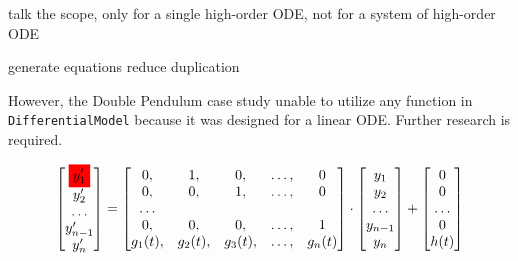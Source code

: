 talk the scope, only for a single high-order ODE, not for a system of high-order ODE

generate equations
reduce duplication

However, the Double Pendulum case study unable to utilize any function in \verb|DifferentialModel| because it was designed for a linear ODE. Further research is required.

\begin{equation} \label{eq_foodeexample}
	\begin{bmatrix}
		\mathcolorbox{red}{y_{1}'} \\
    y_{2}' \\
    \dots  \\
    y_{n-1}' \\
    y_{n}'
	\end{bmatrix}
    = 
  \begin{bmatrix}
		0, & 1, & 0, & \dots, & 0 \\
    0, & 0, & 1, & \dots, & 0 \\
    \dots \\
    0, & 0, & 0, & \dots, & 1 \\
    g_{1}(t), & g_{2}(t), & g_{3}(t), & \dots, & g_{n}(t)
	\end{bmatrix}
    \cdot
  \begin{bmatrix}
		y_{1} \\
    y_{2} \\
    \dots  \\
    y_{n-1} \\
    y_{n}
	\end{bmatrix}
    + 
  \begin{bmatrix}
    0 \\
    0 \\
    \dots  \\
    0 \\
    h(t)
	\end{bmatrix}
\end{equation}
